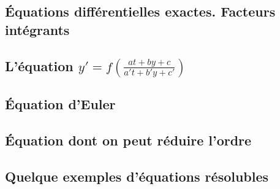 
					\subsection{Équations différentielles exactes. Facteurs intégrants}




					\subsection{L'équation \texorpdfstring{$y'=f\left( \frac{ at+by+c }{ a't+b'y+c' } \right)$}{yat}}


					\subsection{Équation d'Euler}


					\subsection{Équation dont on peut réduire l'ordre}


					\subsection{Quelque exemples d'équations résolubles}

